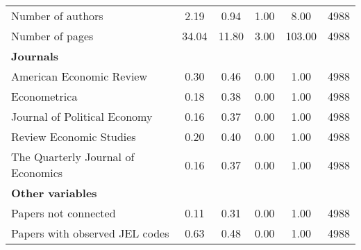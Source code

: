 \begin{tabular}{lccccc}
                 \hspace{3mm}Number of authors &   2.19 &  0.94 &  1.00 &   8.00 & 4988 \\
                   \hspace{3mm}Number of pages &  34.04 & 11.80 &  3.00 & 103.00 & 4988 \\
                             \textbf{Journals} &        &       &       &        &      \\
          \hspace{3mm}American Economic Review &   0.30 &  0.46 &  0.00 &   1.00 & 4988 \\
                      \hspace{3mm}Econometrica &   0.18 &  0.38 &  0.00 &   1.00 & 4988 \\
      \hspace{3mm}Journal of Political Economy &   0.16 &  0.37 &  0.00 &   1.00 & 4988 \\
           \hspace{3mm}Review Economic Studies &   0.20 &  0.40 &  0.00 &   1.00 & 4988 \\
\hspace{3mm}The Quarterly Journal of Economics &   0.16 &  0.37 &  0.00 &   1.00 & 4988 \\
                      \textbf{Other variables} &        &       &       &        &      \\
              \hspace{3mm}Papers not connected &   0.11 &  0.31 &  0.00 &   1.00 & 4988 \\
   \hspace{3mm}Papers with observed JEL codes  &   0.63 &  0.48 &  0.00 &   1.00 & 4988 \\
\bottomrule
\end{tabular}
